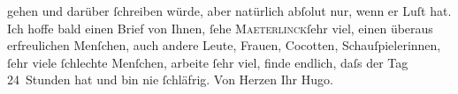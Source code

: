 \begin{ledgroupsized}[t]{13cm}
               gehen und darüber ſchreiben würde, aber natürlich abſolut nur, wenn er Luſt hat.\pend
           \pstart
           Ich hoffe bald einen Brief von Ihnen, ſehe \textsc{Maeterlinck}ſehr viel, einen überaus erfreulichen Menſchen,
               auch andere Leute, Frauen, Cocotten, Schauſpielerinnen, ſehr viele ſchlechte
               Menſchen, arbeite ſehr viel, finde endlich, daſs der Tag 24 Stunden hat und bin nie
               ſchläfrig.\pend
           \pstart Von Herzen Ihr \spacefill\mbox{Hugo.}\pend{}
         
         \endnumbering{}\end{ledgroupsized}  \newcommand{\dateiname}{L01021}\newcommand{\titel}{Hugo von Hofmannsthal an Arthur Schnitzler, 15. 3. [1900]}\newcommand{\editorInnen}{Martin Anton Müller und Gerd-Hermann Susen}
      